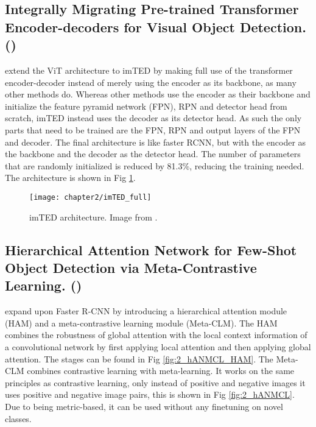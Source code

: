 


\subsection*{Integrally Migrating Pre-trained Transformer Encoder-decoders
for Visual Object Detection. (\citet{imTED})}

\citet{imTED} extend the ViT architecture to imTED by making full use of the transformer encoder-decoder instead of merely using the encoder as its backbone, as many other methods do. Whereas other methods use the encoder as their backbone and initialize the feature pyramid network (FPN), RPN and detector head from scratch, imTED instead uses the decoder as its detector head. As such the only parts that need to be trained are the FPN, RPN and output layers of the FPN and decoder. The final architecture is like faster RCNN, but with the encoder as the backbone and the decoder as the detector head. The number of parameters that are randomly initialized is reduced by 81.3\%, reducing the training needed. The architecture is shown in Fig \ref{fig:2_imTED_full}.


\begin{figure}[h]
	\centering
	\texttt{[image: chapter2/imTED\_full]}
	\caption{\label{fig:2_imTED_full} imTED architecture. Image from \citet{imTED}.}
\end{figure}

\subsection*{Hierarchical Attention Network for Few-Shot
Object Detection via Meta-Contrastive Learning. (\citet{hANMCL})}

\citet{hANMCL} expand upon Faster R-CNN \citep{fasterrcnn} by introducing a  hierarchical attention module (HAM) and a meta-contrastive learning module (Meta-CLM). The HAM combines the robustness of global attention with the local context information of a convolutional network by first applying local attention and then applying global attention. The stages can be found in Fig \ref{fig:2_hANMCL_HAM}. The Meta-CLM combines contrastive learning with meta-learning. It works on the same principles as contrastive learning, only instead of positive and negative images it uses positive and negative image pairs, this is shown in Fig \ref{fig:2_hANMCL}. Due to being metric-based, it can be used without any finetuning on novel classes.

